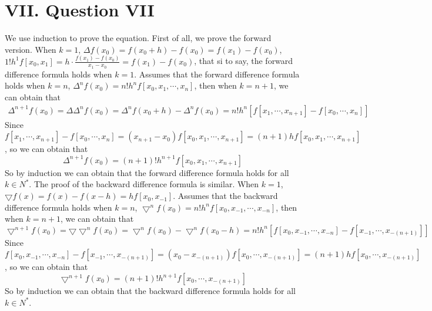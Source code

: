 \documentclass[a4paper]{article}
\begin{document}
\section*{VII. Question VII}
We use induction to prove the equation. First of all, we prove the forward version.
When $k=1$, $\Delta f(x_0)=f(x_0+h)-f(x_0)=f(x_1)-f(x_0)$, $1!h^1f[x_0,x_1]=h\cdot\frac{f(x_1)-f(x_0)}{x_1-x_0}=f(x_1)-f(x_0)$, that si to say,
the forward difference formula holds when $k=1$. Assumes that the forward difference formula holds when $k=n$, $\Delta^nf(x_0)=n!h^nf[x_0,x_1,\cdots,x_n]$, then when $k=n+1$,
we can obtain that 
\begin{align}
  \Delta^{n+1}f(x_0)=\Delta\Delta^nf(x_0)=\Delta^nf(x_0+h)-\Delta^nf(x_0)=n!h^n[f[x_1,\cdots,x_{n+1}]-f[x_0,\cdots,x_n]]
\end{align}
Since $f[x_1,\cdots,x_{n+1}]-f[x_0,\cdots,x_n]=(x_{n+1}-x_0)f[x_0,x_1,\cdots,x_{n+1}]=(n+1)hf[x_0,x_1,\cdots,x_{n+1}]$, so we can obtain that
\begin{equation}
  \Delta^{n+1}f(x_0)=(n+1)!h^{n+1}f[x_0,x_1,\cdots,x_{n+1}]
\end{equation}
So by induction we can obtain that the forward difference formula holds for all $k\in N^{*}$.\newline
The proof of the backward difference formula is similar. When $k=1$, $\bigtriangledown f(x)=f(x)-f(x-h)=hf[x_0,x_{-1}]$. Assumes that the backward difference formula holds when $k=n$,
$\bigtriangledown^n f(x_0)=n!h^n f[x_0,x_{-1},\cdots,x_{-n}]$, then when $k=n+1$, we can obtain that
\begin{equation}
  \bigtriangledown^{n+1}f(x_0)=\bigtriangledown\bigtriangledown^nf(x_0)=\bigtriangledown^nf(x_0)-\bigtriangledown^nf(x_0-h)=n!h^n[f[x_0,x_{-1},\cdots,x_{-n}]-f[x_{-1},\cdots,x_{-(n+1)}]]
\end{equation}
Since $f[x_0,x_{-1},\cdots,x_{-n}]-f[x_{-1},\cdots,x_{-(n+1)}]=(x_0-x_{-(n+1)})f[x_0,\cdots,x_{-(n+1)}]=(n+1)hf[x_0,\cdots,x_{-(n+1)}]$, so we can obtain that
\begin{equation}
  \bigtriangledown^{n+1}f(x_0)=(n+1)!h^{n+1}f[x_0,\cdots,x_{-(n+1)}]
\end{equation}
So by induction we can obtain that the backward difference formula holds for all $k\in N^{*}$.
\end{document}
